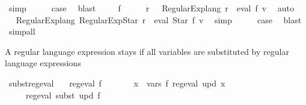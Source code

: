 \begin{isabellebody}
\ simp\isanewline
\ \ \isamarkupfalse%
\ \isamarkupfalse%
\ {\isacharquery}{\kern0pt}case\ \isamarkupfalse%
\ blast\isanewline
{}\isamarkupfalse%
\isanewline
\ \ \isamarkupfalse%
\ {\isacharparenleft}{\kern0pt}{}\ f{\isacharparenright}{\kern0pt}\isanewline
\ \ \isamarkupfalse%
\ \isamarkupfalse%
\ r\ \ \ {\isachardoublequoteopen}Regular{\isacharunderscore}{\kern0pt}Exp{\isachardot}{\kern0pt}lang\ r\ {\isacharequal}{\kern0pt}\ eval\ f\ v{\isachardoublequoteclose}\ \isamarkupfalse%
\ auto\isanewline
\ \ \isamarkupfalse%
\ \isamarkupfalse%
\ {\isachardoublequoteopen}Regular{\isacharunderscore}{\kern0pt}Exp{\isachardot}{\kern0pt}lang\ {\isacharparenleft}{\kern0pt}Regular{\isacharunderscore}{\kern0pt}Exp{\isachardot}{\kern0pt}Star\ r{\isacharparenright}{\kern0pt}\ {\isacharequal}{\kern0pt}\ eval\ {\isacharparenleft}{\kern0pt}Star\ f{\isacharparenright}{\kern0pt}\ v{\isachardoublequoteclose}\ \isamarkupfalse%
\ simp\isanewline
\ \ \isamarkupfalse%
\ \isamarkupfalse%
\ {\isacharquery}{\kern0pt}case\ \isamarkupfalse%
\ blast\isanewline
{}\isamarkupfalse%
\ simp{\isacharunderscore}{\kern0pt}all%
\endisatagproof
{\isafoldproof}%
%
\isadelimproof
%
\endisadelimproof
%
\begin{isamarkuptext}%
A  regular language expression stays  if all variables are substituted
by  regular language expressions%
\end{isamarkuptext}\isamarkuptrue%
\isamarkupfalse%
\ subst{\isacharunderscore}{\kern0pt}reg{\isacharunderscore}{\kern0pt}eval{\isacharcolon}{\kern0pt}\isanewline
\ \ \ {\isachardoublequoteopen}reg{\isacharunderscore}{\kern0pt}eval\ f{\isachardoublequoteclose}\isanewline
\ \ \ \ \ \ \ {\isachardoublequoteopen}{\isasymforall}x\ {\isasymin}\ vars\ f{\isachardot}{\kern0pt}\ reg{\isacharunderscore}{\kern0pt}eval\ {\isacharparenleft}{\kern0pt}upd\ x{\isacharparenright}{\kern0pt}{\isachardoublequoteclose}\isanewline
\ \ \ \ \ {\isachardoublequoteopen}reg{\isacharunderscore}{\kern0pt}eval\ {\isacharparenleft}{\kern0pt}subst\ upd\ f{\isacharparenright}{\kern0pt}{\isachardoublequoteclose}\isanewline

\end{isabellebody}
